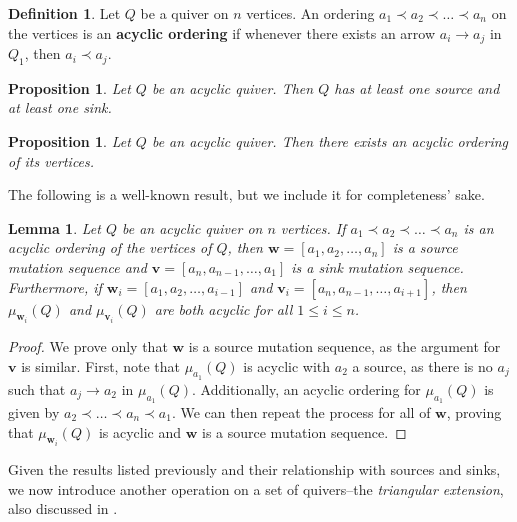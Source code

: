 \documentclass[10pt]{amsart}
\newtheorem{lemm}[thm]{Lemma}
\newtheorem{prop}[thm]{Proposition}
\theoremstyle{definition}
\newtheorem{defi}[thm]{Definition}
\theoremstyle{remark}
\newcommand{\bw}{{\boldsymbol{w}}}
\newcommand{\bv}{{\boldsymbol{v}}}
\begin{document}
\begin{defi}{\cite{MR3822733}} \label{def-acyclic-ordering}
    Let $Q$ be a quiver on $n$ vertices.
    An ordering $a_1 \prec a_2 \prec \dots \prec a_n$ on the vertices is an \textbf{acyclic ordering} if whenever there exists an arrow $a_i \to a_j$ in $Q_1$, then $a_i \prec a_j$.
\end{defi}

\begin{prop}{\cite[Proposition 3.1.1]{MR3822733}} \label{prop-acyclic-source-sink}
    Let $Q$ be an acyclic quiver.
    Then $Q$ has at least one source and at least one sink.
\end{prop}

\begin{prop}{\cite[Proposition 3.1.2]{MR3822733}} \label{prop-acyclic-ordering}
    Let $Q$ be an acyclic quiver.
    Then there exists an acyclic ordering of its vertices.
\end{prop}

The following is a well-known result, but we include it for completeness' sake.

\begin{lemm} \label{lem-acyclic-source-sink}
    Let $Q$ be an acyclic quiver on $n$ vertices.
    If $a_1 \prec a_2 \prec \dots \prec a_n$ is an acyclic ordering of the vertices of $Q$, then $\bw = [a_1, a_2, \dots, a_n]$ is a source mutation sequence and $\bv = [a_n, a_{n-1}, \dots, a_1]$ is a sink mutation sequence.
    Furthermore, if $\bw_i = [a_1, a_2, \dots, a_{i-1}]$ and $\bv_i = [a_n, a_{n-1}, \dots, a_{i+1}]$, then $\mu_{\bw_i}(Q)$ and $\mu_{\bv_i}(Q)$ are both acyclic for all $1 \leq i \leq n$.
\end{lemm}


\begin{proof}
    We prove only that $\bw$ is a source mutation sequence, as the argument for $\bv$ is similar.
    First, note that $\mu_{a_1}(Q)$ is acyclic with $a_2$ a source, as there is no $a_j$ such that $a_j \to a_2$ in $\mu_{a_1}(Q)$.
    Additionally, an acyclic ordering for $\mu_{a_1}(Q)$ is given by $a_2 \prec \dots \prec a_n \prec a_1$.
    We can then repeat the process for all of $\bw$, proving that $\mu_{\bw_i}(Q)$ is acyclic and $\bw$ is a source mutation sequence.
\end{proof}

Given the results listed previously and their relationship with sources and sinks, we now introduce another operation on a set of quivers--the \textit{triangular extension}, also discussed in \cite{bucher_banff_2021, kontsevich_stability_2008, ladkani_cluster_2013}.
\end{document}
